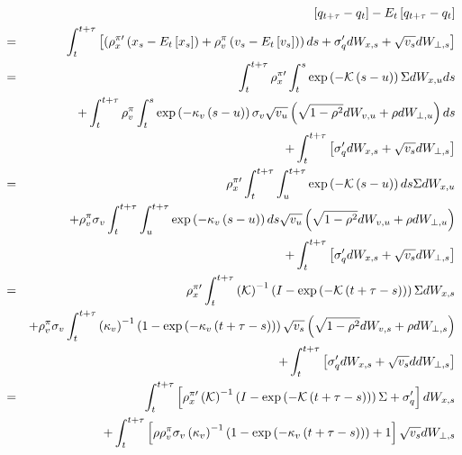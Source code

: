 \documentclass{article}
\begin{document}
\begin{eqnarray*}
&&\left[ q_{t+\tau }-q_{t}\right] -E_{t}\left[ q_{t+\tau }-q_{t}\right]  \\
&=&\int_{t}^{t+\tau }\left[ \left( \rho _{x}^{\pi \prime }\left( x_{s}-E_{t}%
\left[ x_{s}\right] \right) +\rho _{v}^{\pi }\left( v_{s}-E_{t}\left[ v_{s}%
\right] \right) \right) ds+\sigma _{q}^{\prime }dW_{x,s}+\sqrt{v_{s}}%
dW_{\bot ,s}\right]  \\
&=&\int_{t}^{t+\tau }\rho _{x}^{\pi \prime }\int_{t}^{s}\exp \left( -%
\mathcal{K}\left( s-u\right) \right) \Sigma dW_{x,u}ds \\
&&+\int_{t}^{t+\tau }\rho _{v}^{\pi }\int_{t}^{s}\exp \left( -\kappa
_{v}\left( s-u\right) \right) \sigma _{v}\sqrt{v_{u}}\left( \sqrt{1-\rho ^{2}%
}dW_{v,u}+\rho dW_{\bot ,u}\right) ds \\
&&+\int_{t}^{t+\tau }\left[ \sigma _{q}^{\prime }dW_{x,s}+\sqrt{v_{s}}%
dW_{\bot ,s}\right]  \\
&=&\rho _{x}^{\pi \prime }\int_{t}^{t+\tau }\int_{u}^{t+\tau }\exp \left( -%
\mathcal{K}\left( s-u\right) \right) ds\Sigma dW_{x,u} \\
&&+\rho _{v}^{\pi }\sigma _{v}\int_{t}^{t+\tau }\int_{u}^{t+\tau }\exp
\left( -\kappa _{v}\left( s-u\right) \right) ds\sqrt{v_{u}}\left( \sqrt{%
1-\rho ^{2}}dW_{v,u}+\rho dW_{\bot ,u}\right)  \\
&&+\int_{t}^{t+\tau }\left[ \sigma _{q}^{\prime }dW_{x,s}+\sqrt{v_{s}}%
dW_{\bot ,s}\right]  \\
&=&\rho _{x}^{\pi \prime }\int_{t}^{t+\tau }\left( \mathcal{K}\right)
^{-1}\left( I-\exp \left( -\mathcal{K}\left( t+\tau -s\right) \right)
\right) \Sigma dW_{x,s} \\
&&+\rho _{v}^{\pi }\sigma _{v}\int_{t}^{t+\tau }\left( \kappa _{v}\right)
^{-1}\left( 1-\exp \left( -\kappa _{v}\left( t+\tau -s\right) \right)
\right) \sqrt{v_{s}}\left( \sqrt{1-\rho ^{2}}dW_{v,s}+\rho dW_{\bot
,s}\right)  \\
&&+\int_{t}^{t+\tau }\left[ \sigma _{q}^{\prime }dW_{x,s}+\sqrt{v_{s}}%
ddW_{\bot ,s}\right]  \\
&=&\int_{t}^{t+\tau }\left[ \rho _{x}^{\pi \prime }\left( \mathcal{K}\right)
^{-1}\left( I-\exp \left( -\mathcal{K}\left( t+\tau -s\right) \right)
\right) \Sigma +\sigma _{q}^{\prime }\right] dW_{x,s} \\
&&+\int_{t}^{t+\tau }\left[ \rho \rho _{v}^{\pi }\sigma _{v}\left( \kappa
_{v}\right) ^{-1}\left( 1-\exp \left( -\kappa _{v}\left( t+\tau -s\right)
\right) \right) +1\right] \sqrt{v_{s}}dW_{\bot ,s} \\

\end{eqnarray*}
\end{document}
